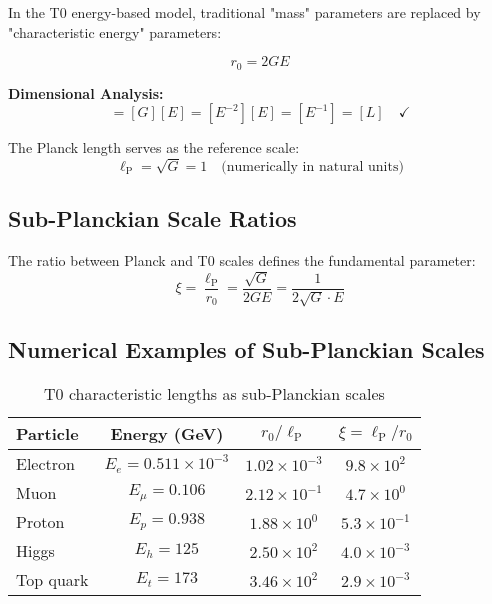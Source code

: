 \documentclass[12pt,a4paper]{report}
\newcommand{\lP}{\ell_{\text{P}}}         %
\newcommand{\rzero}{r_0}                  %
\begin{document}
	In the T0 energy-based model, traditional "mass" parameters are replaced by "characteristic energy" parameters:
	
	\begin{equation}
		\boxed{\rzero = 2GE}
		\label{eq:fundamental_r0}
	\end{equation}
	
	\textbf{Dimensional Analysis:}
	\begin{equation}
		[\rzero] = [G][E] = [E^{-2}][E] = [E^{-1}] = [L] \quad \checkmark
	\end{equation}
	
	The Planck length serves as the reference scale:
	\begin{equation}
		\lP = \sqrt{G} = 1 \quad \text{(numerically in natural units)}
	\end{equation}
	
	\subsection{Sub-Planckian Scale Ratios}
	\label{subsec:sub_planckian_ratios}
	
	The ratio between Planck and T0 scales defines the fundamental parameter:
	\begin{equation}
		\xi = \frac{\lP}{\rzero} = \frac{\sqrt{G}}{2GE} = \frac{1}{2\sqrt{G} \cdot E}
	\end{equation}
	
	\subsection{Numerical Examples of Sub-Planckian Scales}
	\label{subsec:numerical_sub_planckian}
	
	\begin{table}[htbp]
		\centering
		\begin{tabular}{lccc}
			\toprule
			\textbf{Particle} & \textbf{Energy (GeV)} & \textbf{$\rzero/\lP$} & \textbf{$\xi = \lP/\rzero$} \\
			\midrule
			Electron & $E_e = 0.511 \times 10^{-3}$ & $1.02 \times 10^{-3}$ & $9.8 \times 10^{2}$ \\
			Muon & $E_\mu = 0.106$ & $2.12 \times 10^{-1}$ & $4.7 \times 10^{0}$ \\
			Proton & $E_p = 0.938$ & $1.88 \times 10^{0}$ & $5.3 \times 10^{-1}$ \\
			Higgs & $E_h = 125$ & $2.50 \times 10^{2}$ & $4.0 \times 10^{-3}$ \\
			Top quark & $E_t = 173$ & $3.46 \times 10^{2}$ & $2.9 \times 10^{-3}$ \\
			\bottomrule
		\end{tabular}
		\caption{T0 characteristic lengths as sub-Planckian scales}
		\label{tab:sub_planckian_scales}
	\end{table}
	
\end{document}

